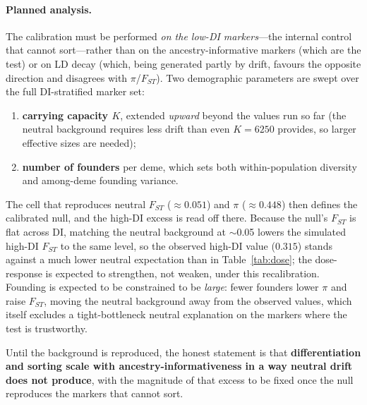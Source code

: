 \documentclass[11pt,a4paper]{article}
\begin{document}
\paragraph{Planned analysis.}
The calibration must be performed \emph{on the low-DI markers}---the internal
control that cannot sort---rather than on the ancestry-informative markers (which
are the test) or on LD decay (which, being generated partly by drift, favours the
opposite direction and disagrees with $\pi$/$F_{ST}$). Two demographic parameters
are swept over the full DI-stratified marker set:
\begin{enumerate}\itemsep2pt
\item \textbf{carrying capacity $K$}, extended \emph{upward} beyond the values run
so far (the neutral background requires less drift than even $K=6250$ provides,
so larger effective sizes are needed);
\item \textbf{number of founders} per deme, which sets both within-population
diversity and among-deme founding variance.
\end{enumerate}
The cell that reproduces neutral $F_{ST}$ ($\approx0.051$) and $\pi$
($\approx0.448$) then defines the calibrated null, and the high-DI excess is read
off there. Because the null's $F_{ST}$ is flat across DI, matching the neutral
background at $\sim$0.05 lowers the simulated high-DI $F_{ST}$ to the same level,
so the observed high-DI value ($0.315$) stands against a much lower neutral
expectation than in Table~\ref{tab:dose}; the dose-response is expected to
strengthen, not weaken, under this recalibration. Founding is expected to be
constrained to be \emph{large}: fewer founders lower $\pi$ and raise $F_{ST}$,
moving the neutral background away from the observed values, which itself
excludes a tight-bottleneck neutral explanation on the markers where the test is
trustworthy.

Until the background is reproduced, the honest statement is that
\textbf{differentiation and sorting scale with ancestry-informativeness in a way
neutral drift does not produce}, with the magnitude of that excess to be fixed
once the null reproduces the markers that cannot sort.
\end{document}
